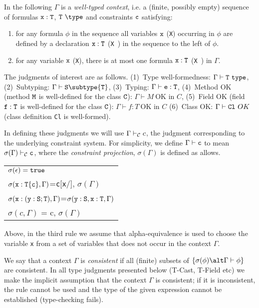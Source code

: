 In the following $\Gamma$ is a {\em well-typed context}, i.e.{} a
(finite, possibly empty) sequence of formulas $\tt x:T$, $\tt T\
\type$ and constraints $\tt c$ satisfying:
\begin{enumerate}
  \item for any formula $\phi$ in the sequence all variables $\tt x$
    ({\tt X}) occurring in $\phi$ are defined by a declaration $\tt
    x:T$ ({\tt X\ \type}) in the sequence to the left of $\phi$.

  \item for any variable $\tt x$ ({\tt X}), there is at most one
  formula $\tt x:T$ ({\tt X\ \type})  in $\Gamma$.
\end{enumerate}

The judgments of interest are as follows. 
(1)~Type well-formedness:  $\Gamma \vdash {\tt T} \ {\tt type}$,
(2)~Subtyping: $\Gamma \vdash {\tt S} \subtype {\tt T}$,
(3)~Typing:   $\Gamma   \vdash {\tt e:T}$,
(4)~Method OK (method $\tt M$ is well-defined for the class $\tt C$): $\Gamma \vdash M\ \mbox{OK in $C$}$,
(5)~Field OK (field $\tt f:T$ is well-defined for the class $\tt
   C$): $\Gamma \vdash f:T\ \mbox{OK in $C$}$
(6)~Class OK: $\Gamma \vdash {\tt Cl} \ OK$ (class definition {\tt Cl} is well-formed). 

In defining these judgments we will use $\Gamma \vdash_{\cal C} c$,
the judgment corresponding to the underlying constraint system. For
simplicity, we define $\Gamma \vdash {\tt c}$ to mean
$\sigma(\Gamma)\vdash_{\cal C} {\tt c}$, where the {\em constraint
projection}, $\sigma(\Gamma)$ is defined as allows. 

\begin{tabular}{l}
$\sigma(\epsilon)={\tt true}$\\
$\sigma({\tt x}:{\tt T\{c\}}, \Gamma)$={\tt c}[{\tt x}/\self], $\sigma(\Gamma)$\\
$\sigma({\tt x}:{\tt (y:S;T)}, \Gamma)$=$\sigma({\tt y:S}, {\tt x}:{\tt T},\Gamma)$\\
$\sigma(c,\Gamma)$ = c, $\sigma(\Gamma)$
\end{tabular}

\noindent Above, in the third rule we assume that alpha-equivalence is used to
choose the variable {\tt x} from a set of variables that does not
occur in the context $\Gamma$.

We say that a context $\Gamma$ is {\em consistent} if all (finite)
subsets of $\{\sigma(\phi)\alt \Gamma \vdash \phi\}$ are consistent.
In all type judgments presented below ({\sc T-Cast}, {\sc T-Field}
etc) we make the implicit assumption that the context $\Gamma$ is
consistent; if it is inconsistent, the rule cannot be used and the
type of the given expression cannot be established (type-checking
fails).

